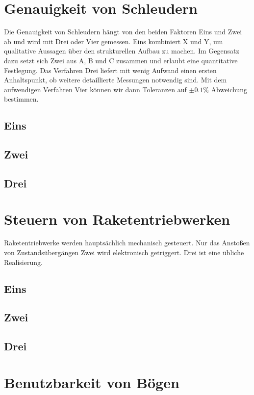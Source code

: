 \documentclass[11pt,a4paper]{report}
\begin{document}
\chapter{Genauigkeit von Schleudern} \label{chap:sling}

Die Genauigkeit von Schleudern hängt von den beiden Faktoren
Eins und Zwei ab und wird mit Drei oder Vier gemessen.
Eins kombiniert X und Y, um qualitative Aussagen über den
strukturellen Aufbau zu machen.
Im Gegensatz dazu setzt sich Zwei aus A, B und C zusammen
und erlaubt eine quantitative Festlegung.
Das Verfahren Drei liefert mit wenig Aufwand einen ersten
Anhaltspunkt, ob weitere detaillierte Messungen notwendig sind.
Mit dem aufwendigen Verfahren Vier können wir dann Toleranzen
auf $\pm 0.1\%$ Abweichung bestimmen.

\section{Eins}

\section{Zwei}

\section{Drei}

\chapter{Steuern von Raketentriebwerken} \label{chap:rocket}

Raketentriebwerke werden hauptsächlich mechanisch gesteuert.
Nur das Anstoßen von Zustandsübergängen Zwei wird elektronisch
getriggert. Drei ist eine übliche Realisierung.

\section{Eins}

\section{Zwei}

\section{Drei}

\chapter{Benutzbarkeit von Bögen} \label{chap:bow}
\end{document}
